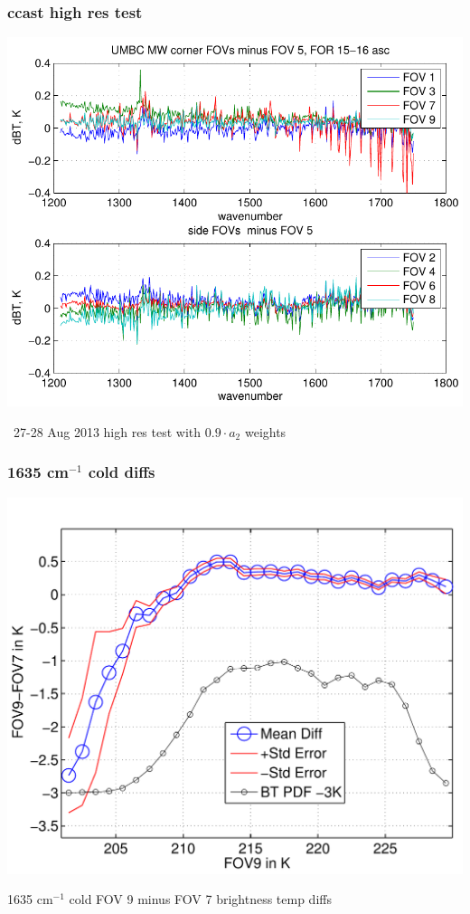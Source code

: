 \documentclass[11pt]{beamer}
\begin{document}
\begin{frame}
\frametitle{ccast high res test}

\begin{center}
  \includegraphics[scale=0.6]{hires_9a2_corr.pdf}
\end{center}

\ccast\ 27-28 Aug 2013 high res test with $0.9 \cdot a_2$ weights

\end{frame}
\begin{frame}
\frametitle{1635 cm$^{-1}$ cold diffs}

\begin{center}
  \includegraphics[scale=0.5]{strow/binned_chan1635wn_fov9_minus_fov7_versus_fov7.pdf}
\end{center}

1635 cm$^{-1}$ cold FOV 9 minus FOV 7 brightness temp diffs

\end{frame}
\end{document}
